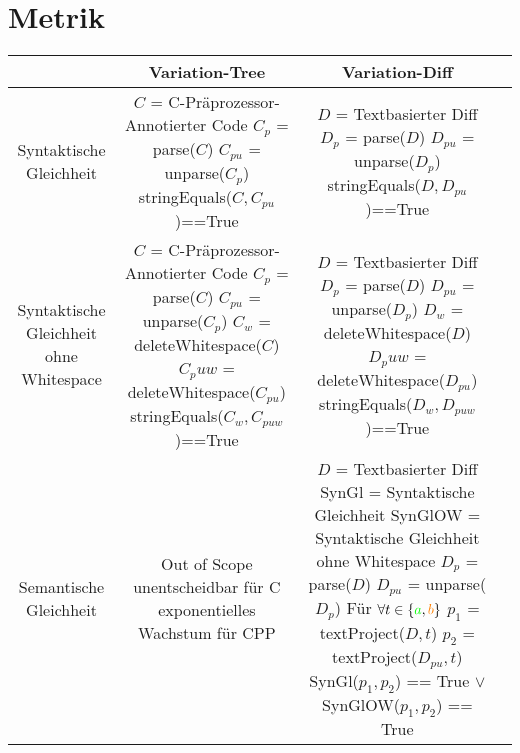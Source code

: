 \section{Metrik}


\begin{center}
	\begin{tabular}{ c||c|c|c| } 
		& Variation-Tree & Variation-Diff \\ 
		\hline
		Syntaktische Gleichheit & \parbox[][3cm][]{5cm}{$C$ = C-Präprozessor-Annotierter Code\\
			$C_p$ = parse($C$)\\
			$C_{pu}$ = unparse($C_p$)\\
			stringEquals($C,C_{pu}$)==True} & \parbox[][3cm][]{5cm}{$D$ = Textbasierter Diff\\
			$D_p$ = parse($D$)\\
			$D_{pu}$ = unparse($D_p$)\\
			stringEquals($D,D_{pu}$)==True} \\ 
		\hline
		\parbox[][1cm][]{4cm}{Syntaktische Gleichheit ohne Whitespace} & \parbox[][4cm][]{5.3cm}{$C$ = C-Präprozessor-Annotierter Code\\
			$C_p$ = parse($C$)\\
			$C_{pu}$ = unparse($C_p$)\\
			$C_w$ = deleteWhitespace($C$)
			$C_puw{}$ = deleteWhitespace($C_{pu}$)
			stringEquals($C_w,C_{puw}$)==True} & \parbox[][4cm][]{5.3cm}{$D$ = Textbasierter Diff\\
			$D_p$ = parse($D$)\\
			$D_{pu}$ = unparse($D_p$)\\
			$D_w$ = deleteWhitespace($D$)
			$D_puw{}$ = deleteWhitespace($D_{pu}$)
			stringEquals($D_w,D_{puw}$)==True} \\ 
		\hline
		Semantische Gleichheit &  \parbox[][3cm][]{4cm}{Out of Scope\\
			unentscheidbar für C\\
			exponentielles Wachstum für CPP}  &  \parbox[][6cm][]{5cm}{$D$ = Textbasierter Diff\\
			SynGl = Syntaktische Gleichheit\\
			SynGlOW = Syntaktische Gleichheit ohne Whitespace\\
			$D_p$ = parse($D$)\\
			$D_{pu}$ = unparse($D_p$)\\
			Für $\forall t \in \{\textcolor{green}{a},\textcolor{orange}{b}\}$\\
			$p_1$ = textProject($D,t$)\\
			$p_2$ = textProject($D_{pu},t$)\\
			SynGl($p_1,p_2$) == True $\lor$ SynGlOW($p_1,p_2$) == True
		} \\
		\hline
	\end{tabular}
\end{center}




